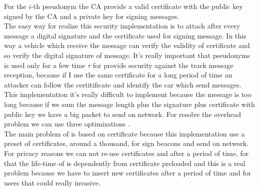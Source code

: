 For the $i$-th pseudonym the CA provide a valid certificate with the public key signed by the CA and a private key for signing messages.\\
The easy way for realize this security implementation is to attach after every message a digital signature and the certificate used for signing message. In this way a vehicle which receive the message can verify the validity of certificate and so verify the digital signature of message. It's really important that pseudonyms is used only for a few time $\tau$ for provide security against the track message reception, because if I use the same certificate for a long period of time an attacker can follow the certitificate and identify the car which send messages. This implementation it's really difficult to implement because the message is too long because if we sum the message length plus the signature plus certificate with public key we have a big packet to send on network. For resolve the overhead problem we can use three optimizations \cite{calandriello}.\\
The main problem of \baseline is based on certificate because this implementation use a preset of certificates, around a thousand, for sign beacons and send on network. For privacy reasons we can not re-use certificates and after a period of time, for that the life-time of \baseline is dependently from certificate preloaded and this is a real problem because we have to insert new certificates after a period of time and for users that could really invasive.